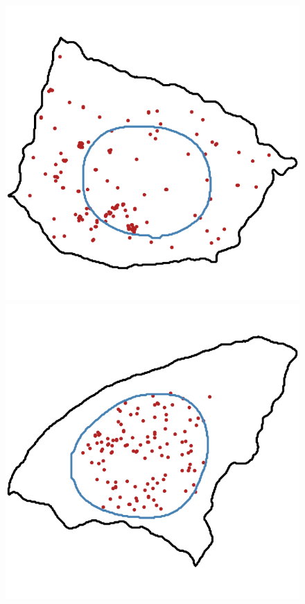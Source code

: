 \begin{figure}[]
	\centering
		\includegraphics[width=\linewidth]{figures/introduction/real_coord_foci}
	\endminipage\hfill
		\includegraphics[width=\linewidth]{figures/introduction/real_coord_intranuclear}

\end{figure}
